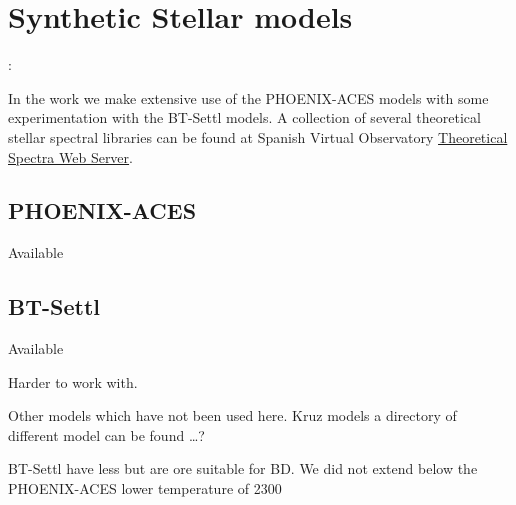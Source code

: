 
\section{Synthetic Stellar models}:

In the work we make extensive use of the {PHOENIX-ACES} models with some experimentation with the {BT-Settl} models.
A collection of several theoretical stellar spectral libraries can be found at Spanish Virtual Observatory \href{http://svo2.cab.inta-csic.es/theory/newov/index.php}{Theoretical Spectra Web Server}.



\subsection{PHOENIX-ACES}

Available 




\subsection{BT-Settl}

Available 

Harder to work with.

Other models which have not been used here. Kruz models a directory of different model can be found \ldots{}?

BT-Settl have less but are ore suitable for BD. We did not extend below the {PHOENIX-ACES} lower temperature of 2300\K{} 

